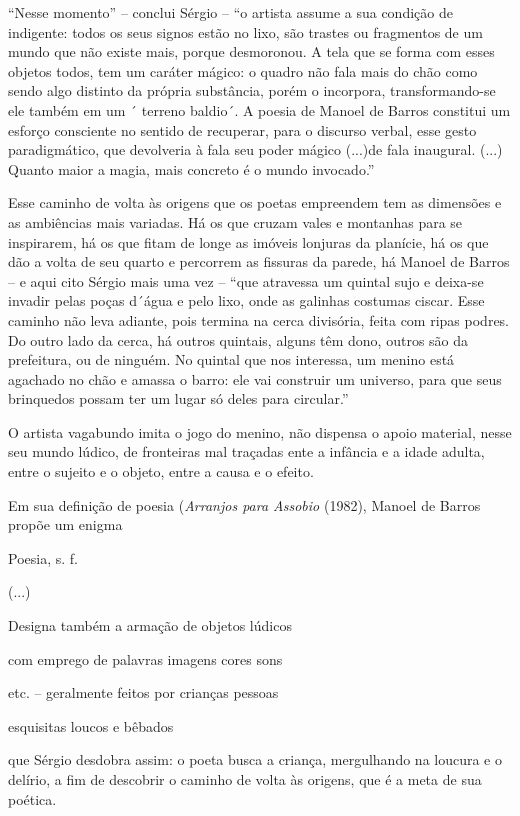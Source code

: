 ``Nesse momento'' -- conclui Sérgio -- ``o artista assume a sua condição
de indigente: todos os seus signos estão no lixo, são trastes ou
fragmentos de um mundo que não existe mais, porque desmoronou. A tela
que se forma com esses objetos todos, tem um caráter mágico: o quadro
não fala mais do chão como sendo algo distinto da própria substância,
porém o incorpora, transformando-se ele também em um ´ terreno baldio´.
A poesia de Manoel de Barros constitui um esforço consciente no sentido
de recuperar, para o discurso verbal, esse gesto paradigmático, que
devolveria à fala seu poder mágico (...)de fala inaugural. (...) Quanto
maior a magia, mais concreto é o mundo invocado.''

Esse caminho de volta às origens que os poetas empreendem tem as
dimensões e as ambiências mais variadas. Há os que cruzam vales e
montanhas para se inspirarem, há os que fitam de longe as imóveis
lonjuras da planície, há os que dão a volta de seu quarto e percorrem as
fissuras da parede, há Manoel de Barros -- e aqui cito Sérgio mais uma
vez -- ``que atravessa um quintal sujo e deixa-se invadir pelas poças
d´água e pelo lixo, onde as galinhas costumas ciscar. Esse caminho não
leva adiante, pois termina na cerca divisória, feita com ripas podres.
Do outro lado da cerca, há outros quintais, alguns têm dono, outros são
da prefeitura, ou de ninguém. No quintal que nos interessa, um menino
está agachado no chão e amassa o barro: ele vai construir um universo,
para que seus brinquedos possam ter um lugar só deles para circular.''

O artista vagabundo imita o jogo do menino, não dispensa o apoio
material, nesse seu mundo lúdico, de fronteiras mal traçadas ente a
infância e a idade adulta, entre o sujeito e o objeto, entre a causa e o
efeito.

Em sua definição de poesia (\emph{Arranjos para Assobio} (1982), Manoel
de Barros propõe um enigma

{Poesia}, s. f.

(...)

Designa também a armação de objetos lúdicos

com emprego de palavras imagens cores sons

etc. -- geralmente feitos por crianças pessoas

esquisitas loucos e bêbados

que Sérgio desdobra assim: o poeta busca a criança, mergulhando na
loucura e o delírio, a fim de descobrir o caminho de volta às origens,
que é a meta de sua poética.

